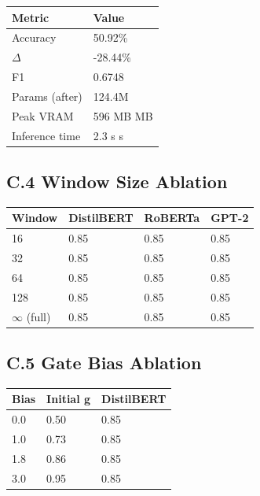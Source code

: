 \begin{table}[H]
\centering
\small
\begin{tabular}{ll}
\toprule
\textbf{Metric} & \textbf{Value} \\
\midrule
Accuracy & 50.92\% \\
$\Delta$ & -28.44\% \\
F1 & 0.6748 \\
Params (after) & 124.4M \\
Peak VRAM & 596 MB MB \\
Inference time & 2.3 s s \\
\bottomrule
\end{tabular}
\end{table}

\subsection{C.4 Window Size Ablation}

\begin{table}[H]
\centering
\small
\begin{tabular}{llll}
\toprule
\textbf{Window} & \textbf{DistilBERT} & \textbf{RoBERTa} & \textbf{GPT-2} \\
\midrule
16 & 0.85 & 0.85 & 0.85 \\
32 & 0.85 & 0.85 & 0.85 \\
64 & 0.85 & 0.85 & 0.85 \\
128 & 0.85 & 0.85 & 0.85 \\
$\infty$ (full) & 0.85 & 0.85 & 0.85 \\
\bottomrule
\end{tabular}
\end{table}

\subsection{C.5 Gate Bias Ablation}

\begin{table}[H]
\centering
\small
\begin{tabular}{lll}
\toprule
\textbf{Bias} & \textbf{Initial g} & \textbf{DistilBERT} \\
\midrule
0.0 & 0.50 & 0.85 \\
1.0 & 0.73 & 0.85 \\
1.8 & 0.86 & 0.85 \\
3.0 & 0.95 & 0.85 \\
\bottomrule
\end{tabular}
\end{table}

